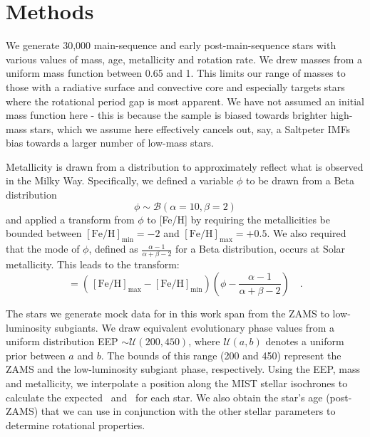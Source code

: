 \section{Methods}
\label{sec:methods}

We generate 30,000 main-sequence and early post-main-sequence stars with various values of mass, age, metallicity and rotation rate.
We drew masses from a uniform mass function between 0.65 and 1. 
This limits our range of masses to those with a radiative surface and convective core and especially targets stars where the rotational period gap is most apparent. 
We have not assumed an initial mass function here - this is because the \kepler{} sample is biased towards brighter high-mass stars, which we assume here effectively cancels out, say, a Saltpeter IMFs bias towards a larger number of low-mass stars.

Metallicity is drawn from a distribution to approximately reflect what is observed in the Milky Way. Specifically, we defined a variable $\phi$ to be drawn from a Beta distribution
\begin{equation}
  \phi \sim \mathcal{B}\left(\alpha=10, \beta=2\right)
\end{equation}
and applied a transform from $\phi$ to [Fe/H] by requiring the metallicities be bounded between $[\mathrm{Fe/H}]_\mathrm{min} =-2$ and $[\mathrm{Fe/H}]_\mathrm{max} = +0.5$. We also required that the mode of $\phi$, defined as $\frac{\alpha - 1}{\alpha + \beta - 2}$ for a Beta distribution, occurs at Solar metallicity. This leads to the transform:
\begin{equation}
  [\mathrm{Fe/H}] = \left(\frac{}{}[\mathrm{Fe/H}]_\mathrm{max}-[\mathrm{Fe/H}]_\mathrm{min}\right)\left(\phi - \frac{\alpha - 1}{\alpha + \beta - 2}\right) \quad .
\end{equation}

The stars we generate mock data for in this work span from the ZAMS to low-luminosity subgiants. We draw equivalent evolutionary phase values from a uniform distribution EEP $\sim \mathcal{U}(200,450)$, where $\mathcal{U}\left(a,b\right)$ denotes a uniform prior between $a$ and $b$.
The bounds of this range (200 and 450) represent the ZAMS and the low-luminosity subgiant phase, respectively. 
Using the EEP, mass and metallicity, we interpolate a position along the MIST stellar isochrones \citep{morton_isochrones_2015} to calculate the expected \teff \ and \logg \ for each star.
We also obtain the star's age (post-ZAMS) that we can use in conjunction with the other stellar parameters to determine rotational properties. 

